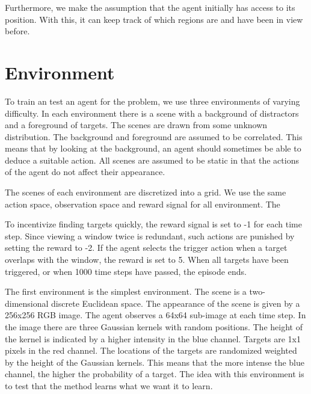 Furthermore, we make the assumption that the agent initially has access to its position.
With this, it can keep track of which regions are and have been in view before.


\section{Environment}
\label{sec:environment}

To train an test an agent for the problem, we use three environments of varying difficulty.
In each environment there is a scene with a background of distractors and a foreground of targets.
The scenes are drawn from some unknown distribution.
The background and foreground are assumed to be correlated.
This means that by looking at the background, an agent should sometimes be able to deduce a suitable action.
All scenes are assumed to be static in that the actions of the agent do not affect their appearance.

The scenes of each environment are discretized into a grid.
We use the same action space, observation space and reward signal for all environment.
The 


To incentivize finding targets quickly, the reward signal is set to -1 for each time step.
Since viewing a window twice is redundant, such actions are punished by setting the reward to -2.
If the agent selects the trigger action when a target overlaps with the window, the reward is set to 5.
When all targets have been triggered, or when 1000 time steps have passed, the episode ends.

The first environment is the simplest environment. 
The scene is a two-dimensional discrete Euclidean space.
The appearance of the scene is given by a 256x256 RGB image.
The agent observes a 64x64 sub-image at each time step.
In the image there are three Gaussian kernels with random positions.
The height of the kernel is indicated by a higher intensity in the blue channel.
Targets are 1x1 pixels in the red channel.
The locations of the targets are randomized weighted by the height of the Gaussian kernels.
This means that the more intense the blue channel, the higher the probability of a target.
The idea with this environment is to test that the method learns what we want it to learn.

